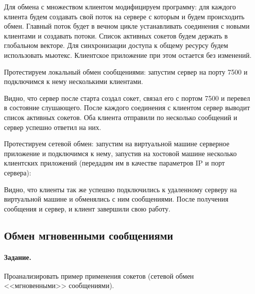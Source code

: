 Для обмена с множеством клиентом модифицируем программу: для каждого клиента будем создавать свой поток на сервере с которым и будем происходить обмен. Главный поток будет в вечном цикле устанавливать соединения с новыми клиентами и создавать потоки. Список активных сокетов будем держать в глобальном векторе. Для синхронизации доступа к общему ресурсу будем использовать мьютекс. Клиентское приложение при этом остается без изменений.



Протестируем локальный обмен сообщениями: запустим сервер на порту 7500 и подключимся к нему несколькими клиентами.







Видно, что сервер после старта создал сокет, связал его с портом 7500 и перевел в состояние слушающего. После каждого соединения с клиентом сервер выводит список активных сокетов. Оба клиента отправили по несколько сообщений и сервер успешно ответил на них.

Протестируем сетевой обмен: запустим на виртуальной машине серверное приложение и подключимся к нему, запустив на хостовой машине несколько клиентских приложений (передадим им в качестве параметров IP и порт сервера):







Видно, что клиенты так же успешно подключились к удаленному серверу на виртуальной машине и обменялись с ним сообщениями. После получения сообщения  и сервер, и клиент завершили свою работу.

\subsection{Обмен мгновенными сообщениями}

\paragraph{Задание.} Проанализировать пример применения сокетов (сетевой обмен <<мгновенными>> сообщениями).

